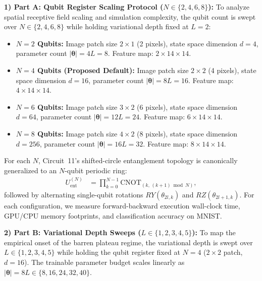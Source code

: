 \documentclass[journal]{IEEEtran}
\begin{document}
\textbf{1) Part A: Qubit Register Scaling Protocol ($N \in \{2, 4, 6, 8\}$):}
To analyze spatial receptive field scaling and simulation complexity, the qubit count is swept over $N \in \{2, 4, 6, 8\}$ while holding variational depth fixed at $L = 2$:
\begin{itemize}
    \item \textbf{$N = 2$ Qubits:} Image patch size $2 \times 1$ (2 pixels), state space dimension $d = 4$, parameter count $|\boldsymbol{\theta}| = 4L = 8$. Feature map: $2 \times 14 \times 14$.
    \item \textbf{$N = 4$ Qubits (Proposed Default):} Image patch size $2 \times 2$ (4 pixels), state space dimension $d = 16$, parameter count $|\boldsymbol{\theta}| = 8L = 16$. Feature map: $4 \times 14 \times 14$.
    \item \textbf{$N = 6$ Qubits:} Image patch size $3 \times 2$ (6 pixels), state space dimension $d = 64$, parameter count $|\boldsymbol{\theta}| = 12L = 24$. Feature map: $6 \times 14 \times 14$.
    \item \textbf{$N = 8$ Qubits:} Image patch size $4 \times 2$ (8 pixels), state space dimension $d = 256$, parameter count $|\boldsymbol{\theta}| = 16L = 32$. Feature map: $8 \times 14 \times 14$.
\end{itemize}
For each $N$, Circuit~11's shifted-circle entanglement topology is canonically generalized to an $N$-qubit periodic ring:
\begin{align}
U_{\mathrm{ent}}^{(N)} &= \prod_{k=0}^{N-1} \mathrm{CNOT}_{(k, \, (k+1)\bmod N)},
\label{eq:n_qubit_cnot_ring}
\end{align}
followed by alternating single-qubit rotations $RY(\theta_{2l, k})$ and $RZ(\theta_{2l+1, k})$. For each configuration, we measure forward-backward execution wall-clock time, GPU/CPU memory footprints, and classification accuracy on MNIST.

\textbf{2) Part B: Variational Depth Sweeps ($L \in \{1, 2, 3, 4, 5\}$):}
To map the empirical onset of the barren plateau regime, the variational depth is swept over $L \in \{1, 2, 3, 4, 5\}$ while holding the qubit register fixed at $N = 4$ ($2 \times 2$ patch, $d = 16$). The trainable parameter budget scales linearly as $|\boldsymbol{\theta}| = 8L \in \{8, 16, 24, 32, 40\}$.
\end{document}
